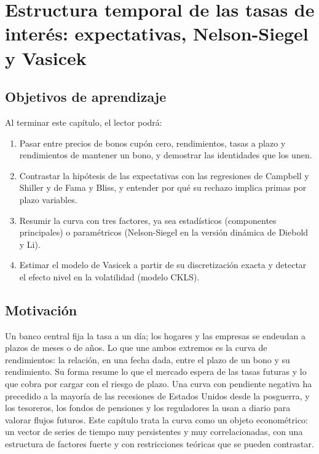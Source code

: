 \chapter[Estructura temporal de tasas]{Estructura temporal de las tasas de interés: expectativas, Nelson-Siegel y Vasicek}\label{cap:tasas}

\section*{Objetivos de aprendizaje}
Al terminar este capítulo, el lector podrá:
\begin{enumerate}[label=\arabic*.,leftmargin=*]
  \item Pasar entre precios de bonos cupón cero, rendimientos, tasas a plazo y rendimientos de mantener un bono, y
        demostrar las identidades que los unen.
  \item Contrastar la hipótesis de las expectativas con las regresiones de Campbell y Shiller y de Fama y Bliss, y
        entender por qué su rechazo implica primas por plazo variables.
  \item Resumir la curva con tres factores, ya sea estadísticos (componentes principales) o paramétricos (Nelson-Siegel
        en la versión dinámica de Diebold y Li).
  \item Estimar el modelo de Vasicek a partir de su discretización exacta y detectar el efecto nivel en la volatilidad
        (modelo CKLS).
\end{enumerate}

\section*{Motivación}
Un banco central fija la tasa a un día; los hogares y las empresas se endeudan a plazos de meses o de años. Lo que une
ambos extremos es la curva de rendimientos: la relación, en una fecha dada, entre el plazo de un bono y su
rendimiento. Su forma resume lo que el mercado espera de las tasas futuras y lo que cobra por cargar con el riesgo de
plazo. Una curva con pendiente negativa ha precedido a la mayoría de las recesiones de Estados Unidos desde la
posguerra, y los tesoreros, los fondos de pensiones y los reguladores la usan a diario para valorar flujos futuros.
Este capítulo trata la curva como un objeto econométrico: un vector de series de tiempo muy persistentes y muy
correlacionadas, con una estructura de factores fuerte y con restricciones teóricas que se pueden contrastar.

